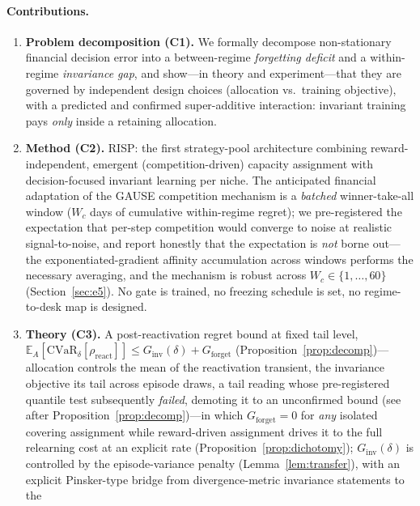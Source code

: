 \documentclass{article}
\newcommand{\E}{\mathbb{E}}
\newcommand{\nm}{\textsc{RISP}}
\newcommand{\regret}{\rho}
\newcommand{\Ginv}{G_{\mathrm{inv}}}
\newcommand{\Gforget}{G_{\mathrm{forget}}}
\begin{document}
\paragraph{Contributions.}
\begin{enumerate}
    \item \textbf{Problem decomposition (C1).} We formally decompose
    non-stationary financial decision error into a between-regime
    \emph{forgetting deficit} and a within-regime \emph{invariance gap}, and
    show---in theory and experiment---that they are governed by independent
    design choices (allocation vs.\ training objective), with a predicted and
    confirmed super-additive interaction: invariant training pays \emph{only}
    inside a retaining allocation.
    \item \textbf{Method (C2).} \nm{}: the first strategy-pool architecture
    combining reward-independent, emergent (competition-driven) capacity
    assignment with decision-focused invariant learning per niche. The
    anticipated financial adaptation of the GAUSE competition mechanism is a
    \emph{batched} winner-take-all window ($W_c$ days of cumulative
    within-regime regret); we pre-registered the expectation that per-step
    competition would converge to noise at realistic signal-to-noise, and
    report honestly that the expectation is \emph{not} borne out---the
    exponentiated-gradient affinity accumulation across windows performs the
    necessary averaging, and the mechanism is robust across
    $W_c \in \{1, \dots, 60\}$ (Section~\ref{sec:e5}). No gate is trained,
    no freezing schedule is set, no regime-to-desk map is designed.
    \item \textbf{Theory (C3).} A post-reactivation regret bound at fixed
    tail level,
    $\E_A[\mathrm{CVaR}_\delta[\regret_{\mathrm{react}}]] \le
    \Ginv(\delta) + \Gforget$
    (Proposition~\ref{prop:decomp})---allocation controls the mean of the
    reactivation transient, the invariance objective its tail across
    episode draws, a tail reading whose pre-registered quantile test
    subsequently \emph{failed}, demoting it to an unconfirmed bound
    (see after Proposition~\ref{prop:decomp})---in which $\Gforget = 0$ for \emph{any}
    isolated covering assignment while reward-driven assignment
    drives it to the full relearning cost at an explicit rate
    (Proposition~\ref{prop:dichotomy}); $\Ginv(\delta)$ is controlled by
    the episode-variance penalty (Lemma~\ref{lem:transfer}), with an explicit
    Pinsker-type bridge from divergence-metric invariance statements to the

\end{enumerate}
\end{document}
